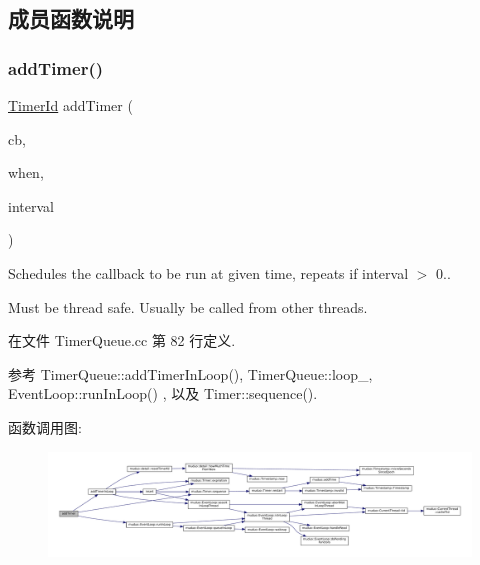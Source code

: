 \subsection{成员函数说明}
\mbox{\label{classmuduo_1_1TimerQueue_af1bd2f1010adf1a82120c708b7a1ba22}} 
\subsubsection{\texorpdfstring{add\+Timer()}{addTimer()}}
{\footnotesize\ttfamily \hyperlink{classmuduo_1_1TimerId}{Timer\+Id} add\+Timer (\begin{DoxyParamCaption}\item[{const \hyperlink{namespacemuduo_a5f7453c2a15825e79bddf5deaec707bf}{Timer\+Callback} \&}]{cb,  }\item[{\hyperlink{classmuduo_1_1Timestamp}{Timestamp}}]{when,  }\item[{double}]{interval }\end{DoxyParamCaption})}

Schedules the callback to be run at given time, repeats if {\ttfamily interval} $>$ 0..

Must be thread safe. Usually be called from other threads. 

在文件 Timer\+Queue.\+cc 第 82 行定义.



参考 Timer\+Queue\+::add\+Timer\+In\+Loop(), Timer\+Queue\+::loop\+\_\+, Event\+Loop\+::run\+In\+Loop() , 以及 Timer\+::sequence().

函数调用图\+:
\nopagebreak
\begin{figure}[H]
\begin{center}
\leavevmode
\includegraphics[width=350pt]{classmuduo_1_1TimerQueue_af1bd2f1010adf1a82120c708b7a1ba22_cgraph}
\end{center}
\end{figure}
\mbox{\label{classmuduo_1_1TimerQueue_adff791c94ab893d2adae1eafe03713ad}} 
